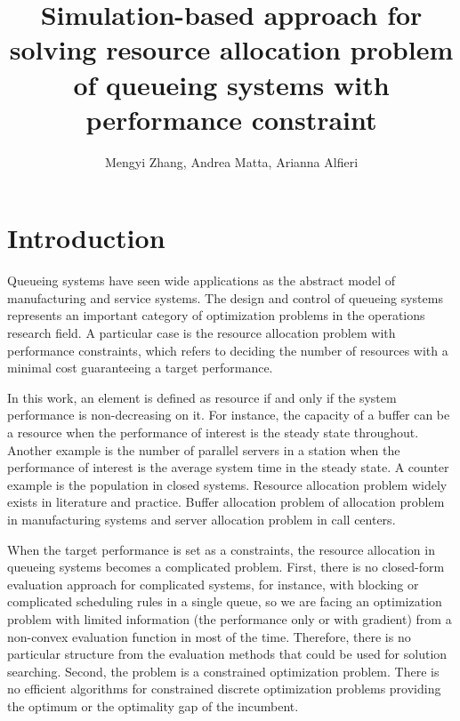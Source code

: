 \documentclass[]{interact}
\title{Simulation-based approach for solving resource allocation problem of queueing systems with performance constraint}
\author{Mengyi Zhang, Andrea Matta, Arianna Alfieri }
\begin{document}
\maketitle

\section{Introduction}

Queueing systems have seen wide applications as the abstract model of manufacturing and service systems. The design and control of queueing systems represents an important category of optimization problems in the operations research field. A particular case is the resource allocation problem with performance constraints, which refers to deciding the number of resources with a minimal cost guaranteeing a target performance.

In this work, an element is defined as resource if and only if the system performance is non-decreasing on it. For instance, the capacity of a buffer can be a resource when the performance of interest is the steady state throughout. Another example is the number of parallel servers in a station when the performance of interest is the average system time in the steady state. A counter example is the population in closed systems. Resource allocation problem widely exists in literature and practice. Buffer allocation problem of allocation problem in manufacturing systems and server allocation problem in call centers.

When the target performance is set as a constraints, the resource allocation in queueing systems becomes a complicated problem. First, there is no closed-form evaluation approach for complicated systems, for instance, with blocking or complicated scheduling rules in a single queue, so we are facing an optimization problem with limited information (the performance only or with gradient) from a non-convex evaluation function in most of the time. Therefore, there is no particular structure from the evaluation methods that could be used for solution searching. Second, the problem is a constrained optimization problem. There is no efficient algorithms for constrained discrete optimization problems providing the optimum or the optimality gap of the incumbent.
\end{document}
